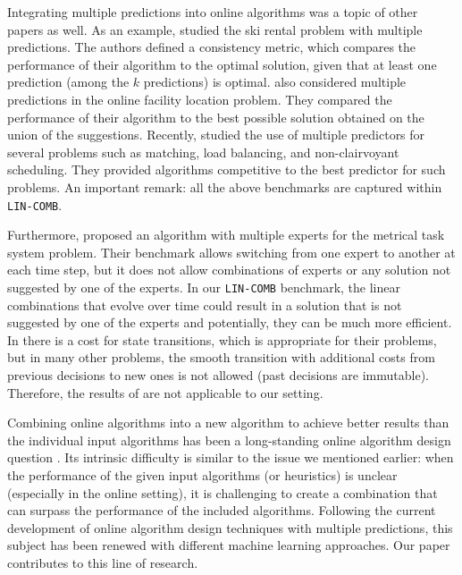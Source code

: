 Integrating multiple predictions into online algorithms was a topic of other papers as well.
As an example, \cite{GollapudiPanigrahi19:skirental-multiple-predictions} studied the ski rental problem with multiple predictions.
The authors defined a consistency metric, which compares the performance of their algorithm to the optimal solution, given that at least one prediction (among the $k$ predictions) is optimal.
\cite{AlmanzaChierichetti21:Online-Facility} also considered multiple predictions in the online facility location problem.
They compared the performance of their algorithm to the best possible solution obtained on the union of the suggestions. Recently, \cite{DinitzIm:Algorithms-with} studied the use of multiple predictors for several problems such as matching, load balancing, and non-clairvoyant scheduling. They provided algorithms competitive to the best predictor for such problems.
An important remark: all the above benchmarks are captured within \texttt{LIN-COMB}.

Furthermore, \cite{AntoniosEtAll23:mixing-predictions-metric-algorithms} proposed an algorithm with multiple experts for the metrical task system problem. Their benchmark allows switching from one expert to another at each time step, but it does not allow combinations of experts or any solution not suggested by one of the experts. In our \texttt{LIN-COMB} benchmark, the linear combinations that evolve over time could result in a solution that is not suggested by one of the experts and potentially, they can be much more efficient. In \cite{AntoniosEtAll23:mixing-predictions-metric-algorithms} there is a cost for state transitions, which is appropriate for their problems, but in many other problems, the smooth transition with additional costs from previous decisions to new ones is not allowed (past decisions are immutable). Therefore, the results of \cite{AntoniosEtAll23:mixing-predictions-metric-algorithms} are not applicable to our setting.

Combining online algorithms into a new algorithm to achieve better results than the individual input algorithms has been a long-standing online algorithm design question \cite{AzarBroder93:On-line-Choice,BlumBurch00:On-line-Learning}.
Its intrinsic difficulty is similar to the issue we mentioned earlier: when the performance of the given input algorithms (or heuristics) is unclear (especially in the online setting), it is challenging to create a combination that can surpass the performance of the included algorithms.
Following the current development of online algorithm design techniques with multiple predictions, this subject has been renewed with different machine learning approaches. Our paper contributes to this line of research.

